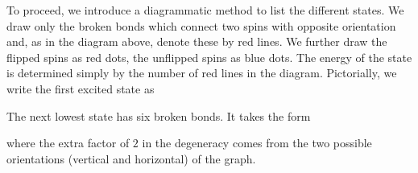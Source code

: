 \documentclass{article}
\theoremstyle{plain}\theoremheaderfont{\normalfont\bfseries}\theorembodyfont{\rmfamily}\theoremseparator{.}\newtheorem*{thm}{Theorem}\newtheorem*{law}{Law}\newtheorem*{pos}{Postulate}
\numberwithin{equation}{section}
\begin{document}
    To proceed, we introduce a diagrammatic method to list the different states. We draw only the broken bonds which connect two spins with opposite orientation and, as in the diagram above, denote these by red lines. We further draw the flipped spins as red dots, the unflipped spins as blue dots. The energy of the state is determined simply by the number of red lines in the diagram. Pictorially, we write the first excited state as
    \begin{figure}[ht!]
        \centering
    \end{figure}

    The next lowest state has six broken bonds. It takes the form
    \begin{figure}[ht!]
        \centering
    \end{figure}
    where the extra factor of \(2\) in the degeneracy comes from the two possible orientations (vertical and horizontal) of the graph.
\end{document}

